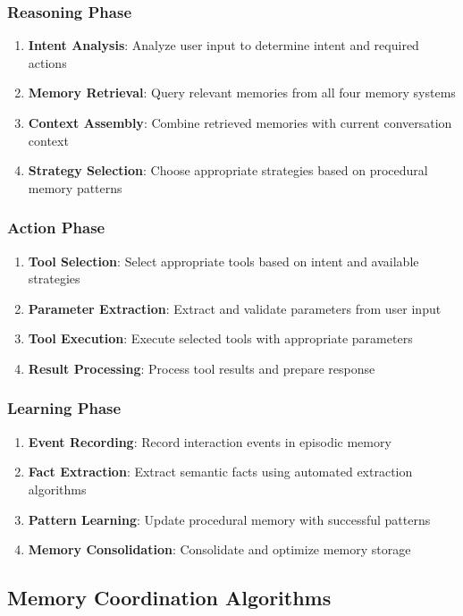 \documentclass[11pt]{article}
\begin{document}
\subsubsection{Reasoning Phase}
\begin{enumerate}
\item \textbf{Intent Analysis}: Analyze user input to determine intent and required actions
\item \textbf{Memory Retrieval}: Query relevant memories from all four memory systems
\item \textbf{Context Assembly}: Combine retrieved memories with current conversation context
\item \textbf{Strategy Selection}: Choose appropriate strategies based on procedural memory patterns
\end{enumerate}

\subsubsection{Action Phase}
\begin{enumerate}
\item \textbf{Tool Selection}: Select appropriate tools based on intent and available strategies
\item \textbf{Parameter Extraction}: Extract and validate parameters from user input
\item \textbf{Tool Execution}: Execute selected tools with appropriate parameters
\item \textbf{Result Processing}: Process tool results and prepare response
\end{enumerate}

\subsubsection{Learning Phase}
\begin{enumerate}
\item \textbf{Event Recording}: Record interaction events in episodic memory
\item \textbf{Fact Extraction}: Extract semantic facts using automated extraction algorithms
\item \textbf{Pattern Learning}: Update procedural memory with successful patterns
\item \textbf{Memory Consolidation}: Consolidate and optimize memory storage
\end{enumerate}

\subsection{Memory Coordination Algorithms}
\end{document}

